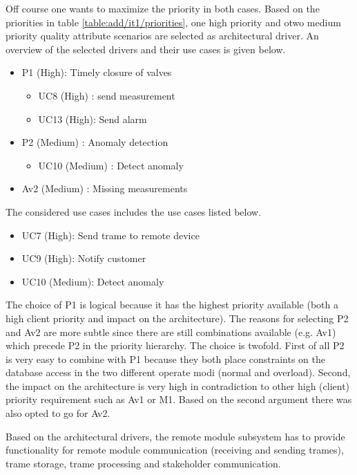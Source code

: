 \npar Off course one wants to maximize the priority in both cases. Based on the
priorities in table \ref{table:add/it1/priorities}, one high priority and otwo
medium priority quality attribute scenarios are selected as architectural driver. An
overview of the selected drivers and their use cases is given below.

\begin{itemize}
  	\item P1 (High): Timely closure of valves
  	\begin{itemize}
  	  	\item UC8 (High) : send measurement
  		\item UC13 (High): Send alarm 
  	\end{itemize}
  	\item P2 (Medium) : Anomaly detection
  	\begin{itemize}
  	  \item UC10 (Medium) : Detect anomaly %
  	\end{itemize} 
  	\item Av2 (Medium) : Missing measurements %
\end{itemize}

\npar The considered use cases includes the use cases listed below. 

\begin{itemize}
	\item UC7 (High): Send trame to remote device
	\item UC9 (High): Notify customer
	\item UC10 (Medium): Detect anomaly
\end{itemize}

\npar The choice of P1 is logical because it has the highest priority available
(both a high client priority and impact on the architecture). The reasons for
selecting P2 and Av2 are more subtle since there are still combinations
available (e.g. Av1) which precede P2 in the priority hierarchy. The choice is
twofold. First of all P2 is very easy to combine with P1 because they both place
constraints on the database access in the two different operate modi (normal and
overload). Second, the impact on the architecture is very high in contradiction
to other high (client) priority requirement such as Av1 or M1. Based on the
second argument there was also opted to go for Av2.

\npar Based on the architectural drivers, the remote module subsystem has to
provide functionality for remote module communication (receiving and sending
trames), trame storage, trame processing and stakeholder communication. 

